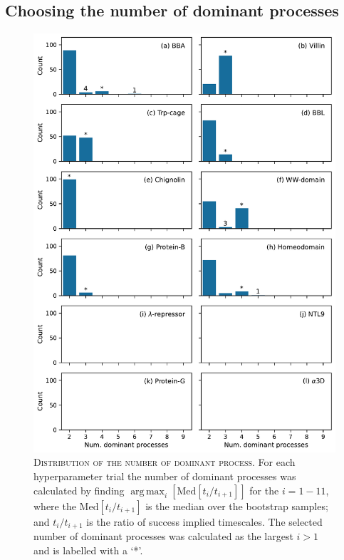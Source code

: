 \documentclass{article}
\DeclareMathOperator*{\argmax}{arg\,max}
\begin{document}
\clearpage
\subsection{Choosing the number of dominant processes}

\begin{figure}[h]
    \centering
    \includegraphics[height=0.6\textheight]{figures/num_dominant_processes_count.pdf}
    \caption{\textsc{Distribution of the number of dominant process.} For each hyperparameter trial the number of dominant processes was calculated by finding $\argmax_{i}\left[\mathrm{Med}[t_{i}/t_{i+1}]\right]$ for the $i = 1 - 11$, where the $\mathrm{Med}[t_{i}/t_{i+1}]$ is the median over the bootstrap samples; and $t_{i}/t_{i+1}
    $ is the ratio of success implied timescales. The selected number of dominant processes was calculated as the largest $i>1$ and is labelled with a `*'.}
    \label{fig:count_num_proc}
\end{figure}
\end{document}
